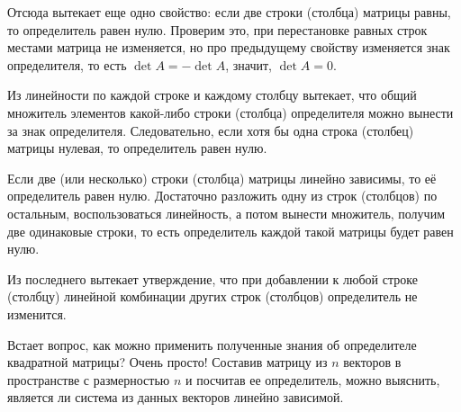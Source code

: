     Отсюда вытекает еще одно свойство: если две строки (столбца) матрицы равны, то определитель равен нулю. Проверим это, при перестановке равных строк местами матрица не изменяется, но про предыдущему свойству изменяется знак определителя, то есть $\det A = - \det A$, значит, $\det A = 0$.

    Из линейности по каждой строке и каждому столбцу вытекает, что общий множитель элементов какой-либо строки (столбца) определителя можно вынести за знак определителя. Следовательно, если хотя бы одна строка (столбец) матрицы нулевая, то определитель равен нулю.

    Если две (или несколько) строки (столбца) матрицы линейно зависимы, то её определитель равен нулю. Достаточно разложить одну из строк (столбцов) по остальным, воспользоваться линейность, а потом вынести множитель, получим две одинаковые строки, то есть определитель каждой такой матрицы будет равен нулю.

    Из последнего вытекает утверждение, что при добавлении к любой строке (столбцу) линейной комбинации других строк (столбцов) определитель не изменится.

    Встает вопрос, как можно применить полученные знания об определителе квадратной матрицы? Очень просто! Составив матрицу из $n$ векторов в пространстве с размерностью $n$ и посчитав ее определитель, можно выяснить, является ли система из данных векторов линейно зависимой.
